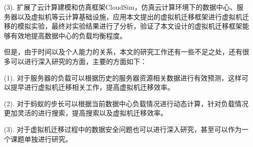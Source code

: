     (3). 扩展了云计算建模和仿真框架CloudSim，仿真云计算环境下的数据中心、服务器以及虚拟机等云计算基础设施，应用本文提出的虚拟机迁移框架进行虚拟机迁移的模拟实验，最终对实验结果进行了分析，验证了本文设计的虚拟机迁移框架能够有效地提高数据中心的负载均衡程度。

但是，由于时间以及个人能力的关系，本文的研究工作还有一些不足之处，还有很多可以进行深入研究的方面，主要的方面如下：

    (1). 对于服务器的负载可以根据历史的服务器资源相关数据进行有效预测，这样可以提早进行虚拟机迁移相关工作，提高虚拟机迁移效率。

    (2). 对于蚂蚁的步长可以根据当前数据中心负载情况进行动态计算，针对负载情况更加灵活的进行搜索，提高搜索以及虚拟机迁移效率。
    
    (3). 对于虚拟机迁移过程中的数据安全问题也可以进行深入研究，甚至可以作为一个课题单独进行研究。



























